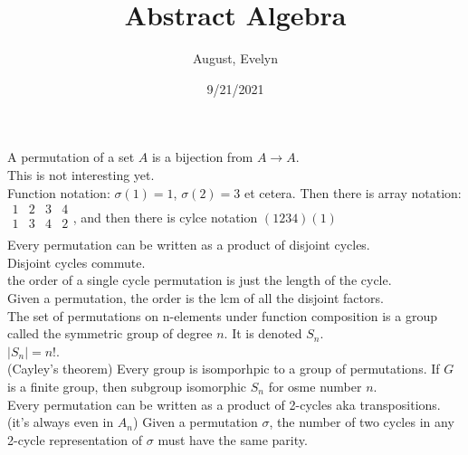 \documentclass{article}
\title{Abstract Algebra}
\author{August, Evelyn}
\date{9/21/2021}
\begin{document}
\maketitle



 A permutation of a set $A$ is a bijection from $A\rightarrow A$. \\

 This is not interesting yet.\\

 Function notation: $\sigma(1) = 1$, $\sigma(2) = 3$ et cetera. Then there is array notation: $\begin{array}{cccc}
     1 & 2 & 3 & 4 \\
     1 & 3 & 4 & 2 \\
\end{array}$, and then there is cylce notation $(1234)(1)$\\

 Every permutation can be written as a product of disjoint cycles.\\

 Disjoint cycles commute.\\

 the order of a single cycle permutation is just the length of the cycle.\\

 Given a permutation, the order is the lcm of all the disjoint factors.\\

 The set of permutations on n-elements under function composition is a group called the symmetric group of degree $n$. It is denoted $S_n$. \\

 $|S_n| = n!$.\\

 (Cayley's theorem) Every group is isomporhpic to a group of permutations. If $G$ is a finite group, then subgroup isomorphic $S_n$ for osme number $n$. \\

 Every permutation can be written as a product of 2-cycles aka transpositions.\\

(it's always even in $A_n$) Given a permutation $\sigma$, the number of two cycles in any 2-cycle representation of $\sigma$ must have the same parity. \\
\end{document}

